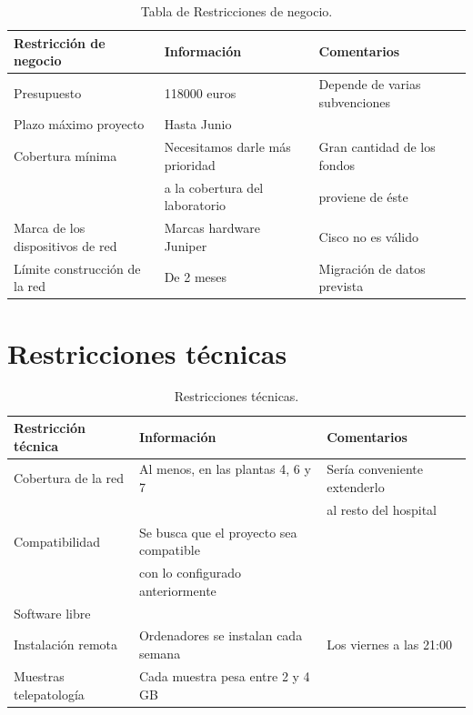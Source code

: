 \begin{table}[H]
	\begin{center}
		\begin{tabular}{|l|l|l|}
			\hline 
			Restricción de negocio & Información & Comentarios \\ 
			\hline \hline
			Presupuesto & 118000 euros & Depende de varias subvenciones \\ \hline
			Plazo máximo proyecto & Hasta Junio & \\ \hline
			Cobertura mínima & Necesitamos darle más prioridad  & Gran cantidad de los fondos \\ 
			 & a la cobertura del laboratorio & proviene de éste  \\ \hline
			Marca de los dispositivos de red & Marcas hardware Juniper & Cisco no es válido\\ \hline
			Límite construcción de la red & De 2 meses & Migración de datos prevista \\ \hline
		\end{tabular}
		\caption{Tabla de Restricciones de negocio.}
		\label{tabla:tabla1}
	\end{center}
\end{table}

\section{Restricciones técnicas}

\begin{table}[H]
	\begin{center}
		\begin{tabular}{|l|l|l|}
			\hline 
			Restricción técnica & Información & Comentarios \\ 
			\hline \hline
			Cobertura de la red & Al menos, en las plantas 4, 6 y 7 & Sería conveniente extenderlo \\
			& & al resto del hospital \\ \hline
			Compatibilidad & Se busca que el proyecto sea compatible & \\ 
		    & con lo configurado anteriormente & \\ \hline
			Software libre &  & \\ \hline
			Instalación remota & Ordenadores se instalan cada semana & Los viernes a las 21:00 \\ \hline
			Muestras telepatología & Cada muestra pesa entre 2 y 4 GB & \\ \hline		
		\end{tabular}
		\caption{Restricciones técnicas.}
		\label{tabla:tabla2}
	\end{center}
\end{table}




